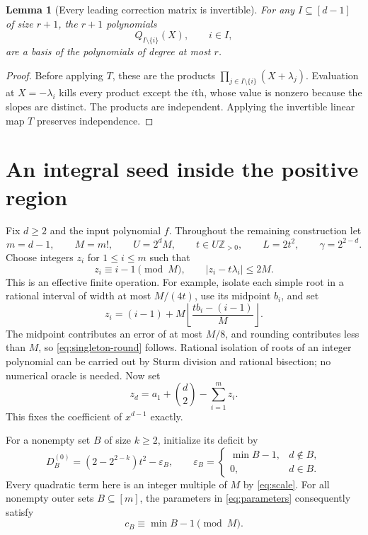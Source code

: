 \documentclass[11pt,a4paper]{article}
\newtheorem{lemma}[theorem]{Lemma}
\theoremstyle{definition}
\newcommand{\Z}{\mathbb Z}
\newcommand{\wt}{\gamma}
\begin{document}
\begin{lemma}[Every leading correction matrix is invertible]
\label{lem:rank}
For any $I\subseteq[d-1]$ of size $r+1$, the $r+1$ polynomials
\[
 Q_{I\setminus\{i\}}(X),\qquad i\in I,
\]
are a basis of the polynomials of degree at most $r$.
\end{lemma}
\begin{proof}
Before applying $T$, these are the products
$\prod_{j\in I\setminus\{i\}}(X+\lambda_j)$.
Evaluation at $X=-\lambda_i$ kills every product except the $i$th,
whose value is nonzero because the slopes are distinct. The products
are independent. Applying the invertible linear map $T$ preserves
independence.
\end{proof}

\section{An integral seed inside the positive region}\label{sec:seed}

Fix $d\ge2$ and the input polynomial $f$. Throughout the remaining
construction let
\begin{equation}\label{eq:scale}
 m=d-1,\qquad M=m!,\qquad U=2^dM,\qquad t\in U\Z_{>0},
 \qquad L=2t^2,\qquad \wt=2^{2-d}.
\end{equation}
Choose integers $z_i$ for $1\le i\le m$ such that
\begin{equation}\label{eq:singleton-round}
 z_i\equiv i-1\pmod M,\qquad
 |z_i-t\lambda_i|\le2M.
\end{equation}
This is an effective finite operation. For example, isolate each simple
root in a rational interval of width at most $M/(4t)$, use its midpoint
$b_i$, and set
\[
 z_i=(i-1)+M\left\lfloor\frac{tb_i-(i-1)}{M}\right\rfloor.
\]
The midpoint contributes an error of at most $M/8$, and rounding
contributes less than $M$, so \eqref{eq:singleton-round} follows.
Rational isolation of roots of an integer polynomial can be carried out
by Sturm division and rational bisection; no numerical oracle is needed.
Now set
\begin{equation}\label{eq:center-trace}
 z_d=a_1+\binom d2-\sum_{i=1}^m z_i.
\end{equation}
This fixes the coefficient of $x^{d-1}$ exactly.

For a nonempty set $B$ of size $k\ge2$, initialize its deficit by
\begin{equation}\label{eq:initial-D}
 D_B^{(0)}=(2-2^{2-k})t^2-\varepsilon_B,\qquad
 \varepsilon_B=
 \begin{cases}
  \min B-1,&d\notin B,\\
  0,&d\in B.
 \end{cases}
\end{equation}
Every quadratic term here is an integer multiple of $M$ by
\eqref{eq:scale}. For all nonempty outer sets $B\subseteq[m]$, the
parameters in \eqref{eq:parameters} consequently satisfy
\begin{equation}\label{eq:nested-congruence}
 c_B\equiv \min B-1\pmod M.
\end{equation}
\end{document}
